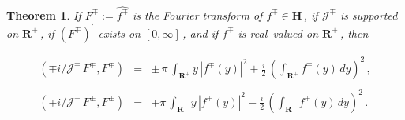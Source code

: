 \documentclass[11pt]{article}
\newtheorem{Theorem}{Theorem}[section]
\begin{document}
 \newpage
\begin{Theorem}%
  \label{Theorem:2.4}
  If $F^\mp := \widehat{f^\mp}$ is the Fourier transform of $f^\mp \in
  {\mathbf H}$\,, if ${\mathcal J}^\mp$ is supported on ${\mathbf
    R}^+$\,, if $(F^\mp)^\prime$ exists on $[0,\infty]$\,, and if
  $f^\mp$ is real--valued on ${\mathbf R}^+$\,, then
  
  \begin{equation}%
    \begin{array}{rcl}
    (\mp i/{\mathcal J}^\mp\,F^\mp,F^\mp) & = & \pm \,  \displaystyle \pi \,
      \int_{{\mathbf R}^+}y\,|f^\mp(y)|^2 + \frac{i}{2} \,
      \left(\int_{{\mathbf R}^+} f^\mp(y) \, dy\right)^2\,, \\
    && \\
    (\mp i/{\mathcal J}^\mp\,F^\pm,F^\pm) & = & \mp \displaystyle \pi \,
      \int_{{\mathbf R}^+}y\,|f^\mp(y)|^2 - \frac{i}{2} \,
      \left(\int_{{\mathbf R}^+} f^\mp(y) \, dy\right)^2\,.
      \end{array}
    \label{equation:2.6}
  \end{equation}

  \end{Theorem}
\end{document}
